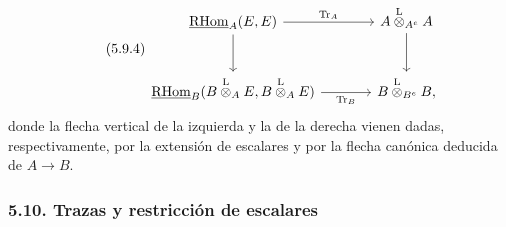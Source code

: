 \begin{equation}\tag{5.9.4}
\begin{tikzcd}[column sep=large,row sep=large]
\uRHom_A(E,E) \arrow[r,"\Tr_A"] \arrow[d] & A\lten_{A^e}A \arrow[d]\\
\uRHom_B(B\lten_AE,B\lten_AE) \arrow[r,"\Tr_B"'] & B\lten_{B^e}B,
\end{tikzcd}
\end{equation}
donde la flecha vertical de la izquierda y la de la derecha vienen dadas, respectivamente, por la extensión de escalares y por la flecha canónica deducida de $A\to B$.

\subsubsection*{5.10. Trazas y restricción de escalares}

